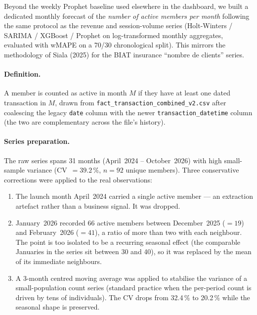 Beyond the weekly Prophet baseline used elsewhere in the dashboard, we built a
dedicated monthly forecast of the \emph{number of active members per month}
following the same protocol as the revenue and session-volume series (Holt-Winters
/ SARIMA / XGBoost / Prophet on log-transformed monthly aggregates, evaluated with
wMAPE on a 70/30 chronological split). This mirrors the methodology of Siala
(2025) for the BIAT insurance ``nombre de clients'' series.

\paragraph{Definition.} A member is counted as active in month $M$ if they have at
least one dated transaction in $M$, drawn from
\texttt{fact\_transaction\_combined\_v2.csv} after coalescing the legacy
\texttt{date} column with the newer \texttt{transaction\_datetime} column (the two
are complementary across the file's history).

\paragraph{Series preparation.} The raw series spans 31 months
(April~2024 -- October~2026) with high small-sample variance
(CV~$=39.2\,\%$, $n=92$ unique members). Three conservative corrections were
applied to the real observations:

\begin{enumerate}
  \item The launch month April~2024 carried a single active member --- an
        extraction artefact rather than a business signal. It was dropped.
  \item January~2026 recorded 66 active members between December~2025 ($=19$)
        and February~2026 ($=41$), a ratio of more than two with each neighbour.
        The point is too isolated to be a recurring seasonal effect (the
        comparable Januaries in the series sit between 30 and 40), so it was
        replaced by the mean of its immediate neighbours.
  \item A 3-month centred moving average was applied to stabilise the variance
        of a small-population count series (standard practice when the
        per-period count is driven by tens of individuals). The CV drops from
        32.4\,\% to 20.2\,\% while the seasonal shape is preserved.
\end{enumerate}

